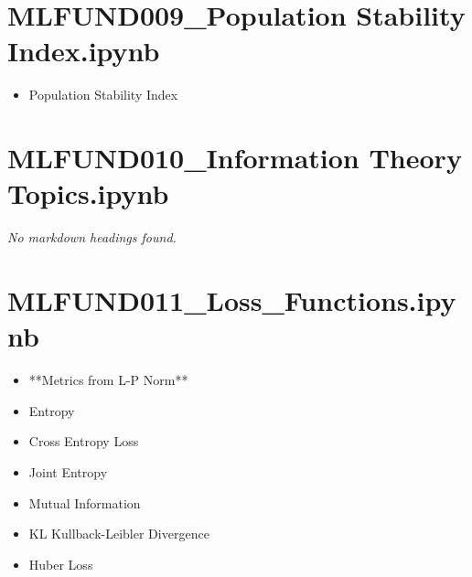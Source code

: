 \documentclass[11pt]{article}
\begin{document}
\section*{MLFUND009\_Population Stability Index.ipynb}
\begin{itemize}
\item Population Stability Index
\end{itemize}
\section*{MLFUND010\_Information Theory Topics.ipynb}
\textit{No markdown headings found.}
\section*{MLFUND011\_Loss\_Functions.ipynb}
\begin{itemize}
\item **Metrics from L-P Norm**
\item Entropy
\item Cross Entropy Loss
\item Joint Entropy
\item Mutual Information
\item KL Kullback-Leibler Divergence
\item Huber Loss
\end{itemize}
\end{document}
